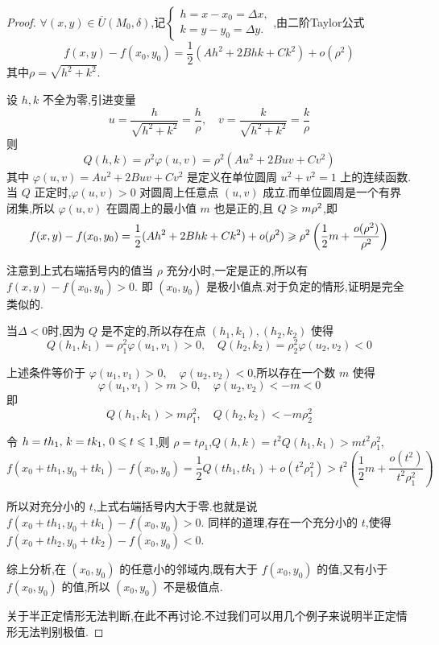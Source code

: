 \begin{proof}
    $\forall (x,y) \in \overline U(M_0,\delta)$,记$\begin{cases}
        h = x - x_0 = \Delta x,\\
        k = y - y_0 = \Delta y.
    \end{cases}$,由二阶Taylor公式
    $$
    f(x,y)-f(x_0,y_0) = \frac{1}{2} \left( Ah^2 + 2Bhk + Ck^2 \right) + o(\rho^2)
    $$
    其中$\rho = \sqrt{h^2 + k^2}$.

    设 $h, k$ 不全为零,引进变量
\[
u = \frac{h}{\sqrt{h^2 + k^2}} = \frac{h}{\rho}, \quad v = \frac{k}{\sqrt{h^2 + k^2}} = \frac{k}{\rho}
\]
则
\[
Q(h, k) = \rho^2 \varphi(u, v) = \rho^2 (Au^2 + 2Buv + Cv^2)
\]
其中 $\varphi(u, v) = Au^2 + 2Buv + Cv^2$ 是定义在单位圆周 $u^2 + v^2 = 1$ 上的连续函数.  
当 $Q$ 正定时,$\varphi(u, v) > 0$ 对圆周上任意点 $(u, v)$ 成立.而单位圆周是一个有界闭集,所以 $\varphi(u, v)$ 在圆周上的最小值 $m$ 也是正的,且 $Q \geqslant m\rho^2$,即
\[
f(x, y) - f(x_0, y_0) = \frac{1}{2}(Ah^2 + 2Bhk + Ck^2) + o(\rho^2) \geqslant \rho^2 \left( \frac{1}{2} m + \frac{o(\rho^2)}{\rho^2} \right)
\]

注意到上式右端括号内的值当 $\rho$ 充分小时,一定是正的,所以有 $f(x, y) - f(x_0, y_0) > 0$.  
即 $(x_0, y_0)$ 是极小值点.对于负定的情形,证明是完全类似的.

当$\Delta < 0 $时,因为 $Q$ 是不定的,所以存在点 $(h_1, k_1), (h_2, k_2)$ 使得
\[
Q(h_1, k_1) = \rho_1^2 \varphi(u_1, v_1) > 0, \quad Q(h_2, k_2) = \rho_2^2 \varphi(u_2, v_2) < 0
\]

上述条件等价于 $\varphi(u_1, v_1) > 0, \quad \varphi(u_2, v_2) < 0$,所以存在一个数 $m$ 使得
\[
\varphi(u_1, v_1) > m > 0, \quad \varphi(u_2, v_2) < -m < 0
\]
即
\[
Q(h_1, k_1) > m\rho_1^2, \quad Q(h_2, k_2) < -m\rho_2^2
\]

令 $h = th_1, \, k = tk_1, \, 0 \leqslant t \leqslant 1$,则 $\rho = t\rho_1$,$Q(h, k) = t^2 Q(h_1, k_1) > mt^2 \rho_1^2$,  
\[
f(x_0 + th_1, y_0 + tk_1) - f(x_0, y_0) = \frac{1}{2} Q(th_1, tk_1) + o(t^2 \rho_1^2) > t^2 \left( \frac{1}{2} m + \frac{o(t^2)}{t^2 \rho_1^2} \right)
\]

所以对充分小的 $t$,上式右端括号内大于零.也就是说 $f(x_0 + th_1, y_0 + tk_1) - f(x_0, y_0) > 0$.  
同样的道理,存在一个充分小的 $t$,使得 $f(x_0 + th_2, y_0 + tk_2) - f(x_0, y_0) < 0$.

综上分析,在 $(x_0, y_0)$ 的任意小的邻域内,既有大于 $f(x_0, y_0)$ 的值,又有小于 $f(x_0, y_0)$ 的值,所以 $(x_0, y_0)$ 不是极值点.

关于半正定情形无法判断,在此不再讨论.不过我们可以用几个例子来说明半正定情形无法判别极值.

\end{proof}

